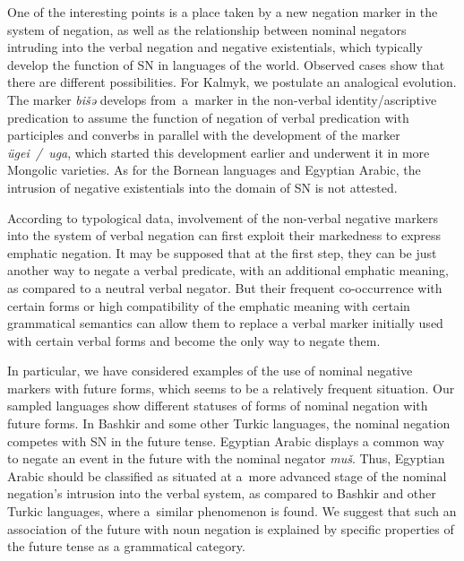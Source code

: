 \documentclass[output=paper,draft,draftmode,colorlinks,citecolor=brown]{langscibook}
\begin{document}
One of the interesting points is a place taken by a new negation marker in the system of negation, as well as the relationship between nominal negators intruding into the verbal negation and negative existentials, which typically develop the function of SN in languages of the world. Observed cases show that there are different possibilities. For Kalmyk, we postulate an analogical evolution. The marker \textit{bišə} develops from a marker in the non-verbal identity/ascriptive predication to assume the function of negation of verbal predication with participles and converbs in parallel with the development of the marker \textit{ügei / uga}, which started this development earlier and underwent it in more Mongolic varieties. As for the Bornean languages and Egyptian Arabic, the intrusion of negative existentials into the domain of SN is not attested.

According to typological data, involvement of the non-verbal negative markers into the system of verbal negation can first exploit their markedness to express emphatic negation. It may be supposed that at the first step, they can be just another way to negate a verbal predicate, with an additional emphatic meaning, as compared to a neutral verbal negator. But their frequent co-occurrence with certain forms or high compatibility of the emphatic meaning with certain grammatical semantics can allow them to replace a verbal marker initially used with certain verbal forms and become the only way to negate them.

In particular, we have considered examples of the use of nominal negative markers with future forms, which seems to be a relatively frequent situation. Our sampled languages show different statuses of forms of nominal negation with future forms. In Bashkir and some other Turkic languages, the nominal negation competes with SN in the future tense. Egyptian Arabic displays a common way to negate an event in the future with the nominal negator \textit{muš}. Thus, Egyptian Arabic should be classified as situated at a more advanced stage of the nominal negation’s intrusion into the verbal system, as compared to Bashkir and other Turkic languages, where a similar phenomenon is found. We suggest that such an association of the future with noun negation is explained by specific properties of the future tense as a grammatical category.
 
\end{document}
